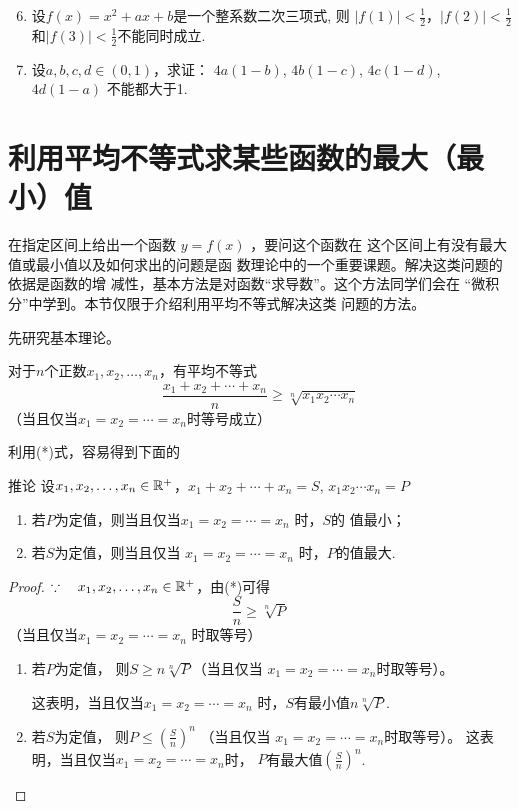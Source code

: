 \begin{enumerate}\setcounter{enumi}{5}
    \item 设$f(x)=x^{2}+ax+b$是一个整系数二次三项式, 则
$|f(1)|<\frac{1}{2}$，$|f(2)|<\frac{1}{2}$和$|f(3)|<\frac{1}{2}$不能同时成立.
\item 设$a,b,c,d\in (0,1)$，求证：
$4a(1-b)$, $4b(1-c)$, $4c(1-d)$, $4d(1-a)$
不能都大于1.
\end{enumerate}

\section{利用平均不等式求某些函数的最大（最小）值}

在指定区间上给出一个函数
$y=f(x)$
，要问这个函数在
这个区间上有没有最大值或最小值以及如何求出的问题是函
数理论中的一个重要课题。解决这类问题的依据是函数的增
减性，基本方法是对函数“求导数”。这个方法同学们会在
“微积分”中学到。本节仅限于介绍利用平均不等式解决这类
问题的方法。

先研究基本理论。

对于$n$个正数$x_1,x_2,\ldots,x_n$，有平均不等式
\begin{equation}
    \frac{x_1+x_2+\cdots+x_n}{n}\ge \sqrt[n]{x_1x_2\cdots x_n}\tag{*}
\end{equation}
（当且仅当$x_1=x_2=\cdots=x_n$时等号成立）

利用(*)式，容易得到下面的

\begin{thm}{推论}
设$x_1,x_2,\ldots,x_n\in\mathbb{R}^+$，$x_1+x_2+\cdots+x_n=S$, $x_1x_2\cdots x_n=P$
\begin{enumerate}[(1)]
    \item 若$P$为定值，则当且仅当$x_1=x_2=\cdots=x_n$
    时，$S$的
    值最小；
    \item 若$S$为定值，则当且仅当
    $x_1=x_2=\cdots=x_n$
    时，$P$的值最大.
\end{enumerate}
\end{thm}

\begin{proof}
$\because\quad x_1,x_2,\ldots,x_n\in\mathbb{R}^+$，由(*)可得 
\[\frac{S}{n}\ge \sqrt[n]{P}\]
（当且仅当$x_1=x_2=\cdots=x_n$
时取等号）

\begin{enumerate}[(1)]
    \item 若$P$为定值，
    则$S\ge n\sqrt[n]{P}$（当且仅当
    $x_1=x_2=\cdots=x_n$时取等号）。

    这表明，当且仅当$x_1=x_2=\cdots=x_n$
    时，$S$有最小值$n\sqrt[n]{P}$.
    \item 若$S$为定值，
    则$P\le \left(\frac{S}{n}\right)^n$
    （当且仅当 $x_1=x_2=\cdots=x_n$时取等号）。
    这表明，当且仅当$x_1=x_2=\cdots=x_n$时，
    $P$有最大值$\left(\frac{S}{n}\right)^n$.
\end{enumerate}

\end{proof}

